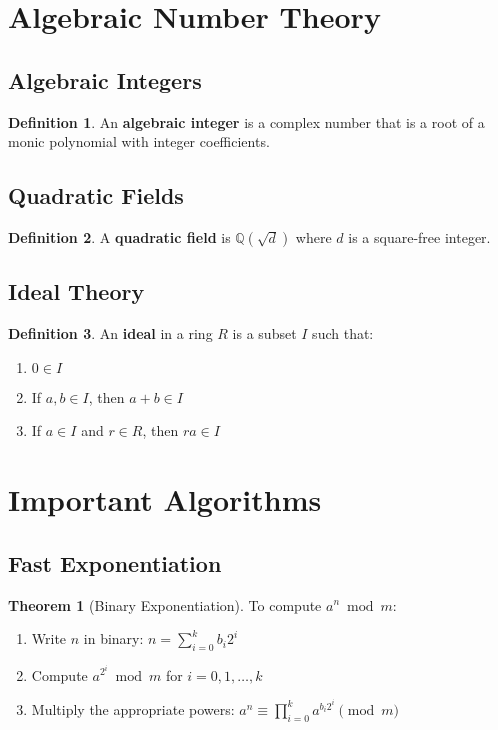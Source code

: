 \documentclass[11pt]{article}
\theoremstyle{definition}
\newtheorem{definition}{Definition}[section]
\newtheorem{theorem}{Theorem}[section]
\begin{document}
\section{Algebraic Number Theory}

\subsection{Algebraic Integers}
\begin{definition}
An \textbf{algebraic integer} is a complex number that is a root of a monic polynomial with integer coefficients.
\end{definition}

\subsection{Quadratic Fields}
\begin{definition}
A \textbf{quadratic field} is $\mathbb{Q}(\sqrt{d})$ where $d$ is a square-free integer.
\end{definition}

\subsection{Ideal Theory}
\begin{definition}
An \textbf{ideal} in a ring $R$ is a subset $I$ such that:
\begin{enumerate}
    \item $0 \in I$
    \item If $a, b \in I$, then $a + b \in I$
    \item If $a \in I$ and $r \in R$, then $ra \in I$
\end{enumerate}
\end{definition}

\section{Important Algorithms}

\subsection{Fast Exponentiation}
\begin{theorem}[Binary Exponentiation]
To compute $a^n \bmod m$:
\begin{enumerate}
    \item Write $n$ in binary: $n = \sum_{i=0}^k b_i 2^i$
    \item Compute $a^{2^i} \bmod m$ for $i = 0, 1, \ldots, k$
    \item Multiply the appropriate powers: $a^n \equiv \prod_{i=0}^k a^{b_i 2^i} \pmod{m}$
\end{enumerate}
\end{theorem}
\end{document}
